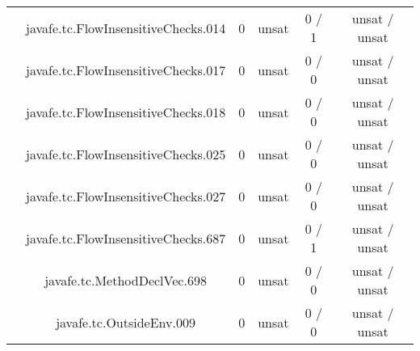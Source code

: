 \begin{table}[htbp]
\begin{minipage}{0.60\textwidth}
{\begin{tabular}[c]{c c!{\vrule width 1.5pt}c|c!{\vrule width 1.5pt}c|c|}
 			& javafe.tc.FlowInsensitiveChecks.014   		      & 0    & unsat   & 0  / 1    & unsat / unsat   \\
 			& javafe.tc.FlowInsensitiveChecks.017   		      & 0    & unsat   & 0  / 0    & unsat / unsat   \\
 			& javafe.tc.FlowInsensitiveChecks.018   		      & 0    & unsat   & 0  / 0    & unsat / unsat   \\
 			& javafe.tc.FlowInsensitiveChecks.025   		      & 0    & unsat   & 0  / 0    & unsat / unsat   \\
 			& javafe.tc.FlowInsensitiveChecks.027	   		      & 0    & unsat   & 0  / 0    & unsat / unsat   \\
		 	& javafe.tc.FlowInsensitiveChecks.687  			      & 0    & unsat   & 0  / 1    & unsat / unsat   \\
 			& javafe.tc.MethodDeclVec.698		   		      & 0    & unsat   & 0  / 0    & unsat / unsat   \\
 			& javafe.tc.OutsideEnv.009		   		      & 0    & unsat   & 0  / 0    & unsat / unsat   \\

\end{tabular}}
\end{minipage}
\end{table}
